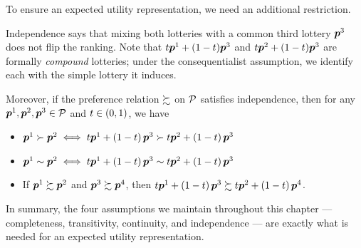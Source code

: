 To ensure an expected utility representation, we need an additional
restriction.


Independence says that mixing both lotteries with a common third
lottery \(\p^3\) does not flip the ranking. Note that
\(t\p^1+(1-t)\p^3\) and \(t\p^2+(1-t)\p^3\) are formally
\emph{compound} lotteries; under the consequentialist assumption, we
identify each with the simple lottery it induces.

Moreover, if the preference relation \(\pref\) on \(\P\) satisfies
independence, then for any \(\p^1,\p^2,\p^3\in \P\) and
\(t\in \pr{0,1}\), we have

\begin{itemize}
\item
  \(\p^1\succ \p^2\iff t\p^1+\pr{1-t}\p^3\succ t\p^2+\pr{1-t}\p^3\)
\item
  \(\p^1\sim \p^2\iff t\p^1+\pr{1-t}\p^3\sim t\p^2+\pr{1-t}\p^3\)
\item
  If \(\p^1\pref\p^2\) and \(\p^3\pref \p^4\), then
  \(t\p^1+\pr{1-t}\p^3\pref t\p^2+\pr{1-t}\p^4\).
\end{itemize}

In summary, the four assumptions we maintain throughout this chapter
— completeness, transitivity, continuity, and independence — are
exactly what is needed for an expected utility representation.


